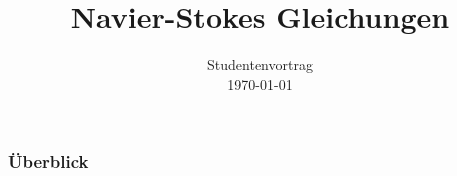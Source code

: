 \documentclass[
	11pt, %
	aspectratio=169, %
]{beamer}
\title[NSG]{Navier-Stokes Gleichungen} %
\author[Jannik Schrempp\and Hendrik Klemm]{}%
\institute[]{University of Stuttgart IAG} %
\date[\myformat\today]{Studentenvortrag \\ \myformat\today} %
\begin{document}
\newcommand\barbelow[1]{\stackunder[1.2pt]{$#1$}{\rule{.8ex}{.075ex}}}

\begin{frame}
		
	\titlepage %

\end{frame}



\begin{frame}
	\frametitle{Überblick} %
	
	\tableofcontents %
\end{frame}

\end{document}
